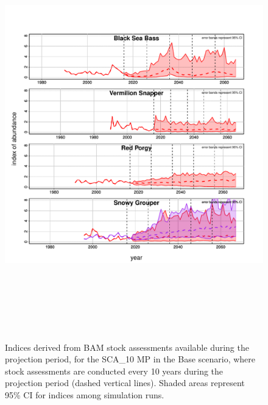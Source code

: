 \documentclass[12pt,english]{article}
\begin{document}
\begin{figure}[!ht]
\begin{center}
\includegraphics[width=6in,height=7in]{../Figs/AddInd.pdf}
\end{center}
\begin{flushleft}
\caption{Indices derived from BAM stock assessments available during the projection period, for the SCA\_10 MP in the Base scenario, where stock assessments are conducted every 10 years during the projection period (dashed vertical lines). Shaded areas represent 95\% CI for indices among simulation runs.}
\label{fig:AddInd}
\end{flushleft}
\end{figure}
\end{document}

